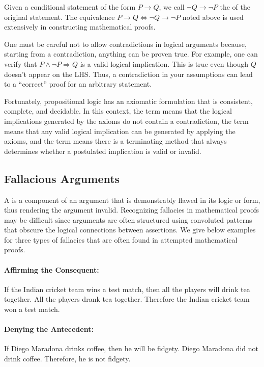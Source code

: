 Given a conditional statement of the form $P \rightarrow Q$, we call $\neg Q \rightarrow \neg P$ the  of the original statement.
The equivalence $P \rightarrow Q \Leftrightarrow \neg Q \rightarrow \neg P$ noted above is used extensively in constructing mathematical proofs.

One must be careful not to allow contradictions in logical arguments because, starting from a contradiction, anything can be proven true.
For example, one can verify that $P \wedge \neg P \Rightarrow Q$ is a valid logical implication.
This is true even though $Q$ doesn't appear on the LHS.
Thus, a contradiction in your assumptions can lead to a ``correct'' proof for an arbitrary statement.

Fortunately, propositional logic has an axiomatic formulation that is consistent, complete, and decidable.
In this context, the term  means that the logical implications generated by the axioms do not contain a contradiction, the term  means that any valid logical implication can be generated by applying the axioms, and the term  means there is a terminating method that always determines whether a postulated implication is valid or invalid.

\subsection{Fallacious Arguments}

A  is a component of an argument that is demonstrably flawed in its logic or form, thus rendering the argument invalid.
Recognizing fallacies in mathematical proofs may be difficult since arguments are often structured using convoluted patterns that obscure the logical connections between assertions.
We give below examples for three types of fallacies that are often found in attempted mathematical proofs.

\paragraph{Affirming the Consequent:}
If the Indian cricket team wins a test match, then all the players will drink tea together.
All the players drank tea together.
Therefore the Indian cricket team won a test match.

\paragraph{Denying the Antecedent:}
If Diego Maradona drinks coffee, then he will be fidgety.
Diego Maradona did not drink coffee.
Therefore, he is not fidgety.


